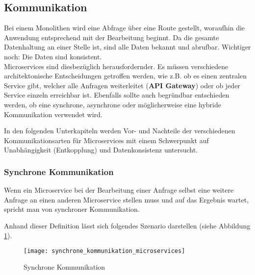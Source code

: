 \subsection{Kommunikation}

Bei einem Monolithen wird eine Abfrage über eine Route gestellt, woraufhin die Anwendung entsprechend mit der Bearbeitung beginnt. Da die gesamte Datenhaltung an einer Stelle ist, sind alle Daten bekannt und abrufbar. Wichtiger noch: Die Daten sind konsistent. \\

Microservices sind diesbezüglich herausfordernder. Es müssen verschiedene architektonische Entscheidungen getroffen werden, wie z.B. ob es einen zentralen Service gibt, welcher alle Anfragen weiterleitet (\textbf{API Gateway}) oder ob jeder Service einzeln erreichbar ist. Ebenfalls sollte auch begründbar entschieden werden, ob eine synchrone,  asynchrone oder möglicherweise eine hybride Kommunikation verwendet wird. 

In den folgenden Unterkapiteln werden Vor- und Nachteile der verschiedenen Kommunikationsarten für Microservices mit einem Schwerpunkt auf Unabhängigkeit (Entkopplung) und Datenkonsistenz untersucht.


\subsubsection{Synchrone Kommunikation}\label{sec:synchrone_kommunikation}

Wenn ein Microservice bei der Bearbeitung einer Anfrage selbst eine weitere Anfrage an einen anderen Microservice stellen muss und auf das Ergebnis wartet, spricht man von synchroner Kommunikation.\cite{wolff2018mic_praxis} 

Anhand dieser Definition lässt sich folgendes Szenario darstellen (siehe Abbildung \ref{fig:synchrone_kommunikation_microservices}). 

\begin{figure}[ht]
	\centering
	\texttt{[image: synchrone\_kommunikation\_microservices]}
	\caption[Synchrone Kommunikation] { Synchrone Kommunikation}
	\label{fig:synchrone_kommunikation_microservices}
\end{figure}

